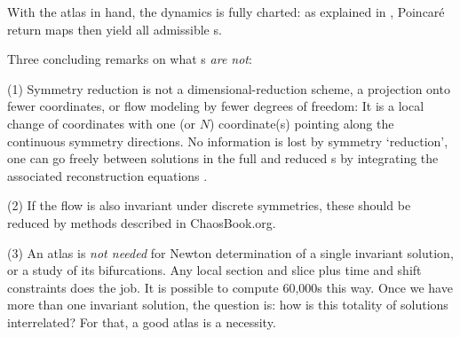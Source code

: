 \documentclass[aip,cha,reprint,
secnumarabic,
nofootinbib, tightenlines,
nobibnotes, showkeys, showpacs,
groupedaddress
]{revtex4-1}
\begin{document}
With the atlas in hand, the dynamics is fully charted: as explained in
, Poincar\'e return maps then yield all
admissible \rpo s.

Three concluding remarks on what \slice s \emph{are not}:

(1) Symmetry reduction is not a dimensional-reduction scheme, a
projection onto fewer coordinates, or flow modeling by fewer degrees of
freedom: It is a local change of coordinates with one (or $N$) coordinate(s)
pointing along the continuous symmetry directions. No information is lost
by symmetry `reduction', one can go freely between solutions in the full
and reduced \statesp s by integrating the associated {reconstruction
equations} .

(2) If the flow is also invariant under discrete symmetries, these should
be reduced by methods described in ChaosBook.org.

(3) An atlas is \emph{not needed} for Newton determination of a single
invariant solution, or a study of its bifurcations. Any local
section and slice plus time and shift constraints does the job. It is possible to compute 60,000\rpo s this way. Once we have more than one
invariant solution, the question is: how is this totality of solutions
interrelated? For that, a good atlas is a necessity.
\end{document}
